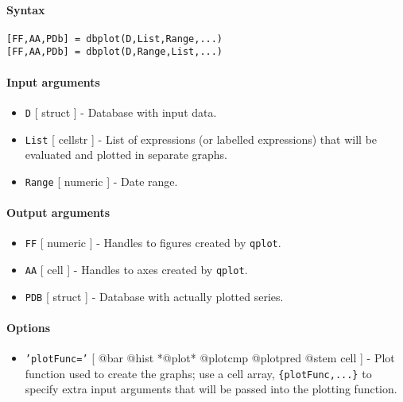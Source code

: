 


	\paragraph{Syntax}

\begin{verbatim}
[FF,AA,PDb] = dbplot(D,List,Range,...)
[FF,AA,PDb] = dbplot(D,Range,List,...)
\end{verbatim}

\paragraph{Input arguments}

\begin{itemize}
\item
  \texttt{D} {[} struct {]} - Database with input data.
\item
  \texttt{List} {[} cellstr {]} - List of expressions (or labelled
  expressions) that will be evaluated and plotted in separate graphs.
\item
  \texttt{Range} {[} numeric {]} - Date range.
\end{itemize}

\paragraph{Output arguments}

\begin{itemize}
\item
  \texttt{FF} {[} numeric {]} - Handles to figures created by
  \texttt{qplot}.
\item
  \texttt{AA} {[} cell {]} - Handles to axes created by \texttt{qplot}.
\item
  \texttt{PDB} {[} struct {]} - Database with actually plotted series.
\end{itemize}

\paragraph{Options}

\begin{itemize}
\itemsep1pt\parskip0pt
\item
  \texttt{'plotFunc='} {[} @bar \textbar{} @hist \textbar{} *@plot*
  \textbar{} @plotcmp \textbar{} @plotpred \textbar{} @stem \textbar{}
  cell {]} - Plot function used to create the graphs; use a cell array,
  \texttt{\{plotFunc,...\}} to specify extra input arguments that will
  be passed into the plotting function.
\end{itemize}

